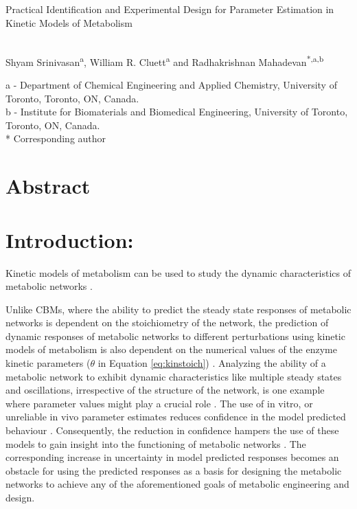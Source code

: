 \documentclass[10pt]{article}
\begin{document}
	\begin{center}
		\begin{Large}
			Practical Identification and Experimental Design for Parameter Estimation in Kinetic Models of Metabolism
		\end{Large}\\
		Shyam Srinivasan\textsuperscript{a}, William R. Cluett\textsuperscript{a} and Radhakrishnan Mahadevan\textsuperscript{*,a,b}\\
	\end{center}
	a - Department of Chemical Engineering and Applied Chemistry, University of Toronto, Toronto, ON, Canada.\\
	b - Institute for Biomaterials and Biomedical Engineering, University of Toronto, Toronto, ON, Canada.\\
	{*} Corresponding author
	\section*{Abstract}
	\section{Introduction:}
	Kinetic models of metabolism can be used to study the dynamic characteristics of metabolic networks \parencite{Bordbar2015, Andreozzi2016}. 
	
	Unlike CBMs, where the ability to predict the steady state responses of metabolic networks is dependent on the stoichiometry of the network, the prediction of dynamic responses of metabolic networks to different perturbations using kinetic models of metabolism is also dependent on the numerical values of the enzyme kinetic parameters ($\theta$ in Equation \ref{eq:kinstoich}) \parencite{Andreozzi2016a}. Analyzing the ability of a metabolic network to exhibit dynamic characteristics like multiple steady states and oscillations, irrespective of the structure of the network, is one example where parameter values might play a crucial role \parencite{Srinivasan2015, Vital-Lopez2006}. The use of in vitro, or unreliable in vivo parameter estimates reduces confidence in the model predicted behaviour \parencite{Andreozzi2016a}. Consequently, the reduction in confidence hampers the use of these models to gain insight into the functioning of metabolic networks \parencite{Chakrabarti2013a, Bordbar2015}. The corresponding increase in uncertainty in model predicted responses becomes an obstacle for using the predicted responses as a basis for designing the metabolic networks to achieve any of the aforementioned goals of metabolic engineering and design.  
	
\end{document}
